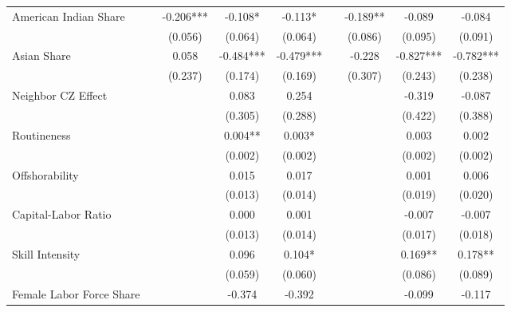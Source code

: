 \begin{table}[htbp]
\begin{tabular}{l*{8}{c}}
\addlinespace
American Indian Share&            &   -0.206***&   -0.108*  &   -0.113*  &            &   -0.189** &   -0.089   &   -0.084   \\
                    &            &  (0.056)   &  (0.064)   &  (0.064)   &            &  (0.086)   &  (0.095)   &  (0.091)   \\
\addlinespace
Asian Share         &            &    0.058   &   -0.484***&   -0.479***&            &   -0.228   &   -0.827***&   -0.782***\\
                    &            &  (0.237)   &  (0.174)   &  (0.169)   &            &  (0.307)   &  (0.243)   &  (0.238)   \\
\addlinespace
Neighbor CZ Effect  &            &            &    0.083   &    0.254   &            &            &   -0.319   &   -0.087   \\
                    &            &            &  (0.305)   &  (0.288)   &            &            &  (0.422)   &  (0.388)   \\
\addlinespace
Routineness         &            &            &    0.004** &    0.003*  &            &            &    0.003   &    0.002   \\
                    &            &            &  (0.002)   &  (0.002)   &            &            &  (0.002)   &  (0.002)   \\
\addlinespace
Offshorability      &            &            &    0.015   &    0.017   &            &            &    0.001   &    0.006   \\
                    &            &            &  (0.013)   &  (0.014)   &            &            &  (0.019)   &  (0.020)   \\
\addlinespace
Capital-Labor Ratio &            &            &    0.000   &    0.001   &            &            &   -0.007   &   -0.007   \\
                    &            &            &  (0.013)   &  (0.014)   &            &            &  (0.017)   &  (0.018)   \\
\addlinespace
Skill Intensity     &            &            &    0.096   &    0.104*  &            &            &    0.169** &    0.178** \\
                    &            &            &  (0.059)   &  (0.060)   &            &            &  (0.086)   &  (0.089)   \\
\addlinespace
Female Labor Force Share&            &            &   -0.374   &   -0.392   &            &            &   -0.099   &   -0.117   \\

\end{tabular}
\end{table}
